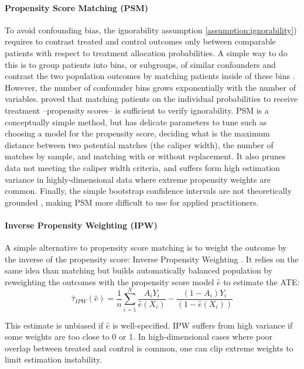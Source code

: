 \documentclass[french,12pt,twoside,a4paper]{book}
\begin{document}
\begin{appendices}
  \paragraph{Propensity Score Matching (PSM)} To avoid confounding bias, the
  ignorability assumption \ref{assumption:ignorability}) requires to contrast
  treated and control outcomes only between comparable patients with respect to
  treatment allocation probabilities. A simple way to do this is to group
  patients into bins, or subgroups, of similar confounders and contrast the two
  population outcomes by matching patients inside of these bins
  \citep{stuart2010matching}. However, the number of confounder bins grows
  exponentially with the number of variables. \cite{rosenbaum_central_1983} proved
  that matching patients on the individual probabilities to receive treatment
  --propensity scores-- is sufficient to verify ignorability. PSM is a
  conceptually simple method, but has delicate parameters to tune such as
  choosing a model for the propensity score, deciding what is the maximum
  distance between two potential matches (the caliper width), the number of
  matches by sample, and matching with or without replacement. It also prunes data
  not meeting the caliper width criteria, and suffers form high estimation
  variance in highly-dimensional data where extreme propensity weights are common.
  Finally, the simple bootstrap confidence intervals are not theoretically
  grounded \citep{abadie2008failure}, making PSM more difficult
  to use for applied practitioners.


  \paragraph{Inverse Propensity Weighting (IPW)}

  A simple alternative to propensity score matching is to weight the outcome by
  the inverse of the propensity score: Inverse Propensity Weighting
  \citep{austin2015moving}. It relies on the same idea than matching but builds
  automatically balanced population by reweighting the outcomes with the
  propensity score model $\hat{e}$ to estimate the ATE:
  \begin{equation}
    \hat \tau_{IPW}(\hat e) = \frac{1}{n} \sum_{i=1}^N \frac{A_i Y_i}{\hat e(X_i)} - \frac{(1-A_i)Y_i}{(1-\hat e(X_i))}
  \end{equation}

  This estimate is unbiased if $\hat e$ is well-specified. IPW suffers from high
  variance if some weights are too close to 0 or 1. In high-dimensional cases
  where poor overlap between treated and control is common, one can clip extreme
  weights to limit estimation instability.


\end{appendices}
\end{document}
